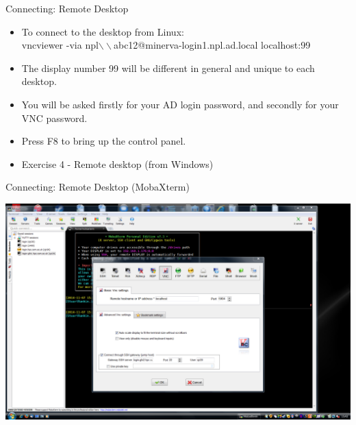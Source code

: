 \begin{frame}[fragile]{Connecting: Remote Desktop}
\begin{itemize}
\item To connect to the desktop from Linux:\\\hfill\break
{\scriptsize
\alert{vncviewer -via npl$\backslash\backslash$abc12@minerva-login1.npl.ad.local localhost:99}}
\smallskip
\item{The display number \alert{99} will be different in general and unique to each desktop.}
\item{You will be asked firstly for your AD login password, and secondly for your VNC password.}
\item{\alert{Press F8 to bring up the control panel.}}
\pause
\item{Exercise 4 - Remote desktop (from Windows)}
\end{itemize}
\end{frame}




\begin{frame}{Connecting: Remote Desktop (MobaXterm)}
\begin{center}
\centerline{\includegraphics[height=0.8\textheight]{imgs/mobaxterm-turbovnc.png}}
\end{center}
\end{frame}

